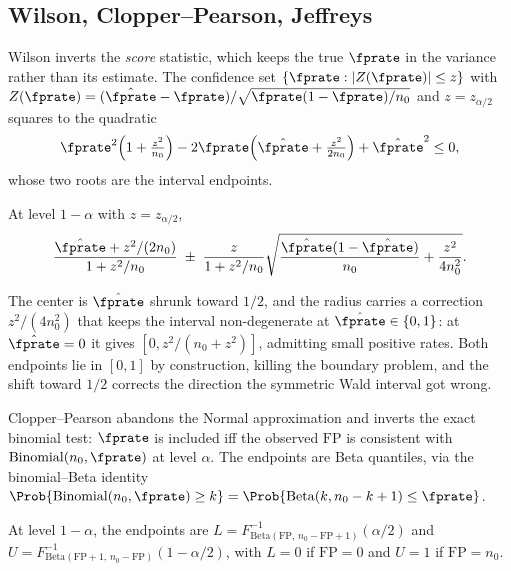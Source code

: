\subsection*{Wilson, Clopper--Pearson, Jeffreys}

Wilson inverts the \emph{score} statistic, which keeps the true $\fprate$ in
the variance rather than its estimate. The confidence set $\{\fprate :
|Z(\fprate)| \le z\}$ with $Z(\fprate) = (\hat{\fprate} - \fprate)/
\sqrt{\fprate(1 - \fprate)/n_0}$ and $z = z_{\alpha/2}$ squares to the
quadratic
\[
  \fprate^2\Bigl(1 + \tfrac{z^2}{n_0}\Bigr)
  - 2\fprate\Bigl(\hat{\fprate} + \tfrac{z^2}{2 n_0}\Bigr)
  + \hat{\fprate}^2 \le 0,
\]
whose two roots are the interval endpoints.

\begin{definition}
\label{def:wilson-ci}
At level $1 - \alpha$ with $z = z_{\alpha/2}$,
\[
  \frac{\hat{\fprate} + z^2/(2 n_0)}{1 + z^2/n_0}
  \;\pm\;
  \frac{z}{1 + z^2/n_0}
    \sqrt{\frac{\hat{\fprate}(1 - \hat{\fprate})}{n_0} + \frac{z^2}{4 n_0^2}}.
\]
\end{definition}

The center is $\hat{\fprate}$ shrunk toward $1/2$, and the radius carries a
correction $z^2/(4 n_0^2)$ that keeps the interval non-degenerate at
$\hat{\fprate} \in \{0, 1\}$: at $\hat{\fprate} = 0$ it gives $[0, z^2/(n_0 +
z^2)]$, admitting small positive rates. Both endpoints lie in $[0,1]$ by
construction, killing the boundary problem, and the shift toward $1/2$
corrects the direction the symmetric Wald interval got wrong.

Clopper--Pearson abandons the Normal approximation and inverts the exact
binomial test: $\fprate$ is included iff the observed $\mathrm{FP}$ is
consistent with $\mathrm{Binomial}(n_0, \fprate)$ at level $\alpha$. The
endpoints are Beta quantiles, via the binomial--Beta identity
$\Prob{\mathrm{Binomial}(n_0, \fprate) \ge k} = \Prob{\mathrm{Beta}(k, n_0 - k
+ 1) \le \fprate}$.

\begin{definition}
\label{def:clopper-pearson-ci}
At level $1 - \alpha$, the endpoints are $L = F^{-1}_{\mathrm{Beta}
(\mathrm{FP},\, n_0 - \mathrm{FP} + 1)}(\alpha/2)$ and $U = F^{-1}_{\mathrm{Beta}
(\mathrm{FP} + 1,\, n_0 - \mathrm{FP})}(1 - \alpha/2)$, with $L = 0$ if
$\mathrm{FP} = 0$ and $U = 1$ if $\mathrm{FP} = n_0$.
\end{definition}

